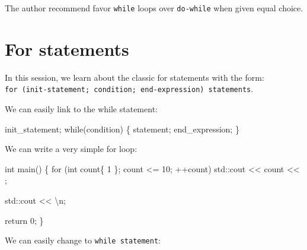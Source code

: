 \documentclass[
  letterpaper,
  DIV=11,
  numbers=noendperiod]{scrreprt}
\newenvironment{Shaded}{\begin{snugshade}}{\end{snugshade}}
\newcommand{\ControlFlowTok}[1]{\textcolor[rgb]{0.00,0.23,0.31}{#1}}
\newcommand{\DecValTok}[1]{\textcolor[rgb]{0.68,0.00,0.00}{#1}}
\newcommand{\ErrorTok}[1]{\textcolor[rgb]{0.68,0.00,0.00}{#1}}
\newcommand{\FunctionTok}[1]{\textcolor[rgb]{0.28,0.35,0.67}{#1}}
\newcommand{\NormalTok}[1]{\textcolor[rgb]{0.00,0.23,0.31}{#1}}
\newcommand{\SpecialCharTok}[1]{\textcolor[rgb]{0.37,0.37,0.37}{#1}}
\newcommand{\StringTok}[1]{\textcolor[rgb]{0.13,0.47,0.30}{#1}}
\begin{document}
The author recommend favor \texttt{while} loops over \texttt{do-while}
when given equal choice.

\hypertarget{for-statements}{%
\section{For statements}\label{for-statements}}

In this session, we learn about the classic for statements with the
form:
\texttt{for\ (init-statement;\ condition;\ end-expression)\ statements}.

We can easily link to the while statement:

\begin{Shaded}
\begin{Highlighting}[]
\NormalTok{init\_statement;}
\ControlFlowTok{while}\NormalTok{(condition)}
\NormalTok{\{}
\NormalTok{    statement;}
\NormalTok{    end\_expression;}
\NormalTok{\}}
\end{Highlighting}
\end{Shaded}

We can write a very simple for loop:

\begin{Shaded}
\begin{Highlighting}[]
\NormalTok{int }\FunctionTok{main}\NormalTok{()}
\NormalTok{\{}
    \ControlFlowTok{for}\NormalTok{ (int count\{ }\DecValTok{1}\NormalTok{ \}; count }\SpecialCharTok{\textless{}=} \DecValTok{10}\NormalTok{; }\SpecialCharTok{++}\NormalTok{count)}
\NormalTok{        std}\SpecialCharTok{::}\NormalTok{cout }\SpecialCharTok{\textless{}}\ErrorTok{\textless{}}\NormalTok{ count }\SpecialCharTok{\textless{}}\ErrorTok{\textless{}} \StringTok{\textquotesingle{} \textquotesingle{}}\NormalTok{;}
    
\NormalTok{    std}\SpecialCharTok{::}\NormalTok{cout }\SpecialCharTok{\textless{}}\ErrorTok{\textless{}} \StringTok{\textquotesingle{}}\SpecialCharTok{\textbackslash{}n}\StringTok{\textquotesingle{}}\NormalTok{;}

\NormalTok{    return }\DecValTok{0}\NormalTok{;}
\NormalTok{\}}
\end{Highlighting}
\end{Shaded}

We can easily change to \texttt{while\ statement}:
\end{document}
